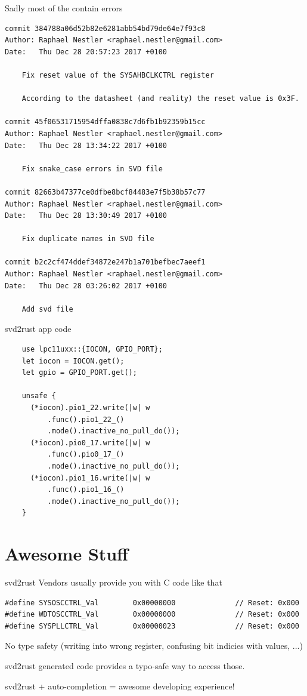 \documentclass[aspectratio=1610,14pt,t]{beamer}
\begin{document}
\begin{frame}[c,fragile]{Sadly most of the contain errors}
  \begin{verbatim}
commit 384788a06d52b82e6281abb54bd79de64e7f93c8
Author: Raphael Nestler <raphael.nestler@gmail.com>
Date:   Thu Dec 28 20:57:23 2017 +0100

    Fix reset value of the SYSAHBCLKCTRL register

    According to the datasheet (and reality) the reset value is 0x3F.

commit 45f06531715954dffa0838c7d6fb1b92359b15cc
Author: Raphael Nestler <raphael.nestler@gmail.com>
Date:   Thu Dec 28 13:34:22 2017 +0100

    Fix snake_case errors in SVD file

commit 82663b47377ce0dfbe8bcf84483e7f5b38b57c77
Author: Raphael Nestler <raphael.nestler@gmail.com>
Date:   Thu Dec 28 13:30:49 2017 +0100

    Fix duplicate names in SVD file

commit b2c2cf474ddef34872e247b1a701befbec7aeef1
Author: Raphael Nestler <raphael.nestler@gmail.com>
Date:   Thu Dec 28 03:26:02 2017 +0100

    Add svd file
  \end{verbatim}
\end{frame}

\begin{frame}[c,fragile]{svd2rust app code}
  \begin{verbatim}
    use lpc11uxx::{IOCON, GPIO_PORT};
    let iocon = IOCON.get();
    let gpio = GPIO_PORT.get();

    unsafe {
      (*iocon).pio1_22.write(|w| w
          .func().pio1_22_()
          .mode().inactive_no_pull_do());
      (*iocon).pio0_17.write(|w| w
          .func().pio0_17_()
          .mode().inactive_no_pull_do());
      (*iocon).pio1_16.write(|w| w
          .func().pio1_16_()
          .mode().inactive_no_pull_do());
    }
  \end{verbatim}
\end{frame}

\section{Awesome Stuff}

\begin{frame}[c,fragile]{svd2rust}
  Vendors usually provide you with C code like that
  \begin{verbatim}
#define SYSOSCCTRL_Val        0x00000000              // Reset: 0x000
#define WDTOSCCTRL_Val        0x00000000              // Reset: 0x000
#define SYSPLLCTRL_Val        0x00000023              // Reset: 0x000
  \end{verbatim}
  No type safety (writing into wrong register, confusing bit indicies with values, ...)

  svd2rust generated code provides a typo-safe way to access those.

  svd2rust + auto-completion = awesome developing experience!
\end{frame}
\end{document}
